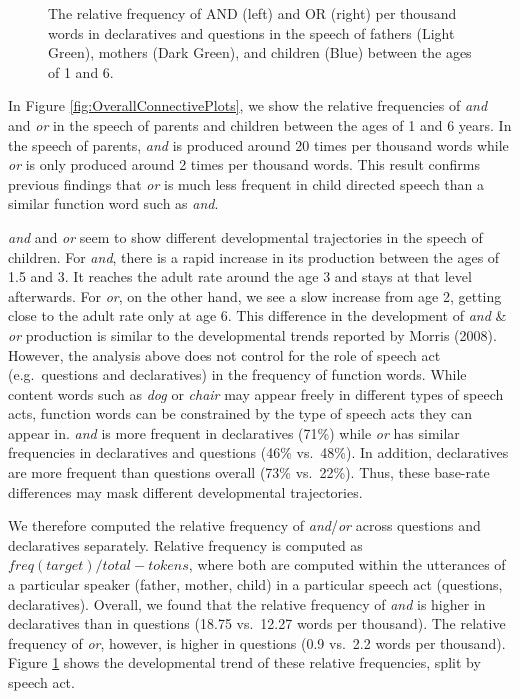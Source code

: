 \documentclass[10pt, letterpaper]{article}
\newenvironment{CodeChunk}{}{}
\begin{document}
\begin{CodeChunk}
\begin{figure}[t]
{}

\caption[The relative frequency of AND (left) and OR (right) per thousand words in declaratives and questions in the speech of fathers (Light Green), mothers (Dark Green), and children (Blue) between the ages of 1 and 6]{The relative frequency of AND (left) and OR (right) per thousand words in declaratives and questions in the speech of fathers (Light Green), mothers (Dark Green), and children (Blue) between the ages of 1 and 6.}\label{fig:byspeechActPlots}
\end{figure}
\end{CodeChunk}

In Figure \ref{fig:OverallConnectivePlots}, we show the relative
frequencies of \emph{and} and \emph{or} in the speech of parents and
children between the ages of 1 and 6 years. In the speech of parents,
\emph{and} is produced around 20 times per thousand words while
\emph{or} is only produced around 2 times per thousand words. This
result confirms previous findings that \emph{or} is much less frequent
in child directed speech than a similar function word such as
\emph{and}.

\emph{and} and \emph{or} seem to show different developmental
trajectories in the speech of children. For \emph{and}, there is a rapid
increase in its production between the ages of 1.5 and 3. It reaches the
adult rate around the age 3 and stays at that level afterwards. For
\emph{or}, on the other hand, we see a slow increase from age 2, getting
close to the adult rate only at age 6. This difference in the
development of \emph{and} \& \emph{or} production is similar to the
developmental trends reported by Morris (2008). However, the analysis
above does not control for the role of speech act (e.g.~questions and
declaratives) in the frequency of function words. While content words
such as \emph{dog} or \emph{chair} may appear freely in different types
of speech acts, function words can be constrained by the type of speech
acts they can appear in. \emph{and} is more frequent in declaratives
(71\%) while \emph{or} has similar frequencies in declaratives and
questions (46\% vs.~48\%). In addition, declaratives are more frequent
than questions overall (73\% vs.~22\%). Thus, these base-rate
differences may mask different developmental trajectories.

We therefore computed the relative frequency of \emph{and}/\emph{or}
across questions and declaratives separately. Relative frequency is
computed as \(freq(target) / total-tokens\), where both are computed
within the utterances of a particular speaker (father, mother, child) in
a particular speech act (questions, declaratives). Overall, we found
that the relative frequency of \emph{and} is higher in declaratives than
in questions (18.75 vs.~12.27 words per thousand). The relative
frequency of \emph{or}, however, is higher in questions (0.9 vs.~2.2
words per thousand). Figure \ref{fig:byspeechActPlots} shows the
developmental trend of these relative frequencies, split by speech act.
\end{document}
